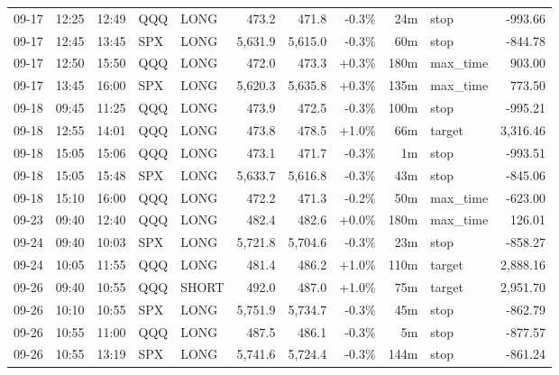 \documentclass[11pt,a4paper,twoside]{article}
\begin{document}
\begin{center}
\begin{longtable}{>{\color{txtmain}}l l l l l r r r r >{\color{txtmain}}l r}
09-17 & 12:25 & 12:49 & QQQ & LONG & 473.2 & 471.8 & \textcolor{lossred}{-0.3\%} & 24m & stop & \textcolor{lossred}{-993.66} \\
09-17 & 12:45 & 13:45 & SPX & LONG & 5,631.9 & 5,615.0 & \textcolor{lossred}{-0.3\%} & 60m & stop & \textcolor{lossred}{-844.78} \\
09-17 & 12:50 & 15:50 & QQQ & LONG & 472.0 & 473.3 & \textcolor{wingreen}{+0.3\%} & 180m & max\_time & \textcolor{wingreen}{903.00} \\
09-17 & 13:45 & 16:00 & SPX & LONG & 5,620.3 & 5,635.8 & \textcolor{wingreen}{+0.3\%} & 135m & max\_time & \textcolor{wingreen}{773.50} \\
09-18 & 09:45 & 11:25 & QQQ & LONG & 473.9 & 472.5 & \textcolor{lossred}{-0.3\%} & 100m & stop & \textcolor{lossred}{-995.21} \\
09-18 & 12:55 & 14:01 & QQQ & LONG & 473.8 & 478.5 & \textcolor{wingreen}{+1.0\%} & 66m & target & \textcolor{wingreen}{3,316.46} \\
09-18 & 15:05 & 15:06 & QQQ & LONG & 473.1 & 471.7 & \textcolor{lossred}{-0.3\%} & 1m & stop & \textcolor{lossred}{-993.51} \\
09-18 & 15:05 & 15:48 & SPX & LONG & 5,633.7 & 5,616.8 & \textcolor{lossred}{-0.3\%} & 43m & stop & \textcolor{lossred}{-845.06} \\
09-18 & 15:10 & 16:00 & QQQ & LONG & 472.2 & 471.3 & \textcolor{lossred}{-0.2\%} & 50m & max\_time & \textcolor{lossred}{-623.00} \\
09-23 & 09:40 & 12:40 & QQQ & LONG & 482.4 & 482.6 & \textcolor{wingreen}{+0.0\%} & 180m & max\_time & \textcolor{wingreen}{126.01} \\
09-24 & 09:40 & 10:03 & SPX & LONG & 5,721.8 & 5,704.6 & \textcolor{lossred}{-0.3\%} & 23m & stop & \textcolor{lossred}{-858.27} \\
09-24 & 10:05 & 11:55 & QQQ & LONG & 481.4 & 486.2 & \textcolor{wingreen}{+1.0\%} & 110m & target & \textcolor{wingreen}{2,888.16} \\
09-26 & 09:40 & 10:55 & QQQ & SHORT & 492.0 & 487.0 & \textcolor{wingreen}{+1.0\%} & 75m & target & \textcolor{wingreen}{2,951.70} \\
09-26 & 10:10 & 10:55 & SPX & LONG & 5,751.9 & 5,734.7 & \textcolor{lossred}{-0.3\%} & 45m & stop & \textcolor{lossred}{-862.79} \\
09-26 & 10:55 & 11:00 & QQQ & LONG & 487.5 & 486.1 & \textcolor{lossred}{-0.3\%} & 5m & stop & \textcolor{lossred}{-877.57} \\
09-26 & 10:55 & 13:19 & SPX & LONG & 5,741.6 & 5,724.4 & \textcolor{lossred}{-0.3\%} & 144m & stop & \textcolor{lossred}{-861.24} \\

\end{longtable}
\end{center}
\end{document}
